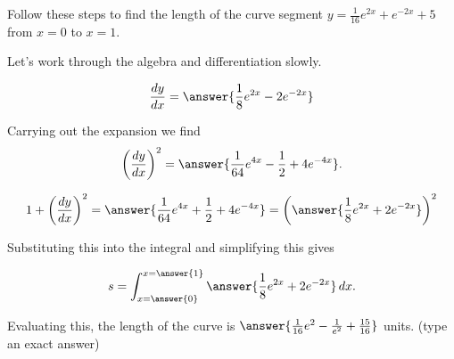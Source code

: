 \documentclass{ximera}
\author{Jim Talamo}
\begin{document}
\begin{exercise}

Follow these steps to find the length of the curve segment $y=\frac{1}{16}e^{2x}+e^{-2x}+5$ from $x=0$ to $x=1$.

Let's work through the algebra and differentiation slowly.

\[
\frac{\d y}{\d x} = \answer{\frac{1}{8}e^{2x}-2e^{-2x}}
\]

Carrying out the expansion we find
\[
\left(\frac{\d y}{\d x}\right)^2 = \answer{\frac{1}{64}e^{4x}-\frac{1}{2}+4e^{-4x}}.
\]

\begin{exercise}

\[
1+ \left(\frac{\d y}{\d x}\right)^2 = \answer{\frac{1}{64}e^{4x}+\frac{1}{2}+4e^{-4x}} = \left(\answer{\frac{1}{8}e^{2x}+2e^{-2x} }  \right)^2
\]

\begin{exercise}
Substituting this into the integral and simplifying this gives

\[
s= \int_{x=\answer{0}}^{x=\answer{1}} \answer{\frac{1}{8}e^{2x}+2e^{-2x}} \d x .
\]

Evaluating this, the length of the curve is $\answer{\frac{1}{16}e^2-\frac{1}{e^2} +\frac{15}{16} }$ units. (type an exact answer)


\end{exercise}
\end{exercise}
\end{exercise}
\end{document}
